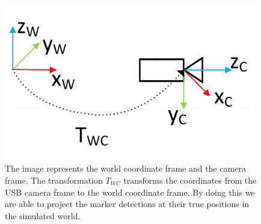   
\begin{figure}
  \centering
  \includegraphics[width=0.98\textwidth]{images/world_cam_v2.pdf}
  \caption{The image represents the world coordinate frame and the camera frame. The transformation $T_{WC}$ transforms the coordinates from the USB camera frame to the world coordinate frame. By doing this we are able to project the marker detections at their true positions in the simulated world.}
  \label{pics:worldcamframe}
\end{figure}
 
